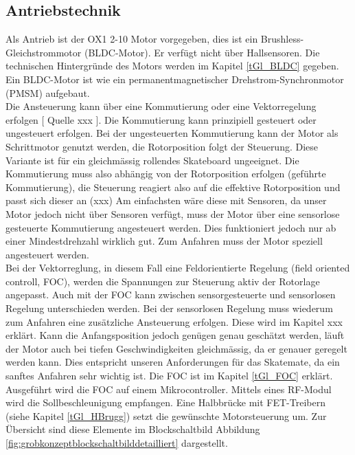 \subsection*{Antriebstechnik}
Als Antrieb ist der OX1 2-10 Motor vorgegeben, dies ist ein Brushless-Gleichstrommotor (BLDC-Motor). Er verfügt nicht über Hallsensoren. Die technischen Hintergründe des Motors werden im Kapitel \ref{tGl_BLDC} gegeben. Ein BLDC-Motor ist wie ein permanentmagnetischer Drehstrom-Synchronmotor (PMSM) aufgebaut.\\
Die Ansteuerung kann über eine Kommutierung oder eine Vektorregelung erfolgen\cite{BLDC} [ Quelle xxx ]. Die Kommutierung kann prinzipiell gesteuert oder ungesteuert erfolgen. Bei der ungesteuerten Kommutierung kann der Motor als Schrittmotor genutzt werden, die Rotorposition folgt der Steuerung. Diese Variante ist für ein gleichmässig rollendes Skateboard ungeeignet. Die Kommutierung muss also abhängig von der Rotorposition erfolgen (geführte Kommutierung), die Steuerung reagiert also auf die effektive Rotorposition und passt sich dieser an (xxx)  Am einfachsten wäre diese mit Sensoren, da unser Motor jedoch nicht über Sensoren verfügt, muss der Motor über eine sensorlose gesteuerte Kommutierung angesteuert werden. Dies funktioniert jedoch nur ab einer Mindestdrehzahl wirklich gut. Zum Anfahren muss der Motor speziell angesteuert werden. \\
Bei der Vektorreglung, in diesem Fall eine Feldorientierte Regelung (field oriented controll, FOC), werden die Spannungen zur Steuerung aktiv der Rotorlage angepasst. Auch mit der FOC kann zwischen sensorgesteuerte und sensorlosen Regelung unterschieden werden. Bei der sensorlosen Regelung muss wiederum zum Anfahren eine zusätzliche Ansteuerung erfolgen. Diese wird im Kapitel xxx erklärt. Kann die Anfangsposition jedoch genügen genau geschätzt werden, läuft der Motor auch bei tiefen Geschwindigkeiten gleichmässig, da er genauer geregelt werden kann. Dies entspricht unseren Anforderungen für das Skatemate, da ein sanftes Anfahren sehr wichtig ist. Die FOC ist im Kapitel \ref{tGl_FOC} erklärt.\\
Ausgeführt wird die FOC auf einem Mikrocontroller. Mittels eines RF-Modul wird die Sollbeschleunigung empfangen. Eine Halbbrücke mit FET-Treibern (siehe Kapitel \ref{tGl_HBrugg}) setzt  die gewünschte Motorsteuerung um. Zur Übersicht sind diese Elemente im Blockschaltbild Abbildung \ref{fig:grobkonzeptblockschaltbilddetailliert} dargestellt. 

